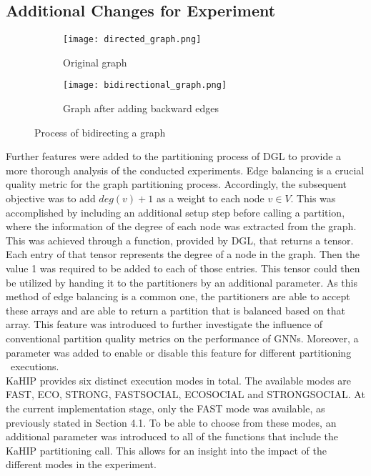 \documentclass[acmsmall,nonacm,screen,review]{acmart}
\begin{document}
\subsection{Additional Changes for Experiment}
\begin{figure}[bt!]
     \centering
     \begin{subfigure}[b]{0.45\textwidth}
         \centering
         \texttt{[image: directed\_graph.png]}
         \caption{Original graph}
         \label{uni}
     \end{subfigure}
     \hfill
     \begin{subfigure}[b]{0.45\textwidth}
         \centering
         \texttt{[image: bidirectional\_graph.png]}
         \caption{Graph after adding backward edges}
         \label{bi}
     \end{subfigure}
     \caption{Process of bidirecting a graph}
     \label{bidirecting}
\end{figure}
Further features were added to the partitioning process of DGL to provide a more thorough analysis of the conducted experiments. Edge balancing is a crucial quality metric for the graph partitioning process. Accordingly, the subsequent objective was to add $deg(v) + 1$ as a weight to each node $v \in V$. This was accomplished by including an additional setup step before calling a partition, where the information of the degree of each node was extracted from the graph. This was achieved through a function, provided by DGL, that returns a tensor. Each entry of that tensor represents the degree of a node in the graph. Then the value 1 was required to be added to each of those entries. This tensor could then be utilized by handing it to the partitioners by an additional parameter. As this method of edge balancing is a common one, the partitioners are able to accept these arrays and are able to return a partition that is balanced based on that array. This feature was introduced to further investigate the influence of conventional partition quality metrics on the performance of GNNs. Moreover, a parameter was added to enable or disable this feature for different partitioning ~executions.  \\
KaHIP provides six distinct execution modes in total. The available modes are FAST, ECO, STRONG, FASTSOCIAL, ECOSOCIAL and STRONGSOCIAL. At the current implementation stage, only the FAST mode was available, as previously stated in Section 4.1. To be able to choose from these modes, an additional parameter was introduced to all of the functions that include the KaHIP partitioning call. This allows for an insight into the impact of the different modes in the experiment.
\end{document}
